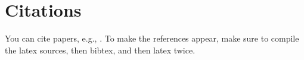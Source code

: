 \section{Citations}

You can cite papers, e.g., \cite{test-ref}.
To make the references appear, make sure to compile the latex sources, then bibtex, and then latex twice.